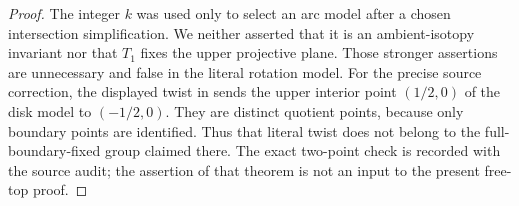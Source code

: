 \begin{proof}
The integer $k$ was used only to select an arc model after a chosen
intersection simplification. We neither asserted that it is an
ambient-isotopy invariant nor that $T_1$ fixes the upper projective
plane. Those stronger assertions are unnecessary and false in the
literal rotation model.
For the precise source correction, the displayed twist in
\cite[Appendix~A, Theorem~A.6, pp.~614--615]{BoyleChen2024}
sends the upper interior point $(1/2,0)$ of the disk model to
$(-1/2,0)$. They are distinct quotient points, because only
boundary points are identified. Thus that literal twist does not
belong to the full-boundary-fixed group claimed there. The exact
two-point check is recorded with the source audit; the assertion of
that theorem is not an input to the present free-top proof.
\end{proof}
